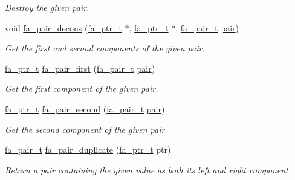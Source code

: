 \begin{DoxyCompactItemize}
\begin{DoxyCompactList}\small\item\em Destroy the given pair. \end{DoxyCompactList}\item 
void \hyperlink{group___fa_pair_ga7e797364d4d31cd174d974b16627cdfe}{fa\-\_\-pair\-\_\-decons} (\hyperlink{group___fa_ga915ddeae99ad7568b273d2b876425197}{fa\-\_\-ptr\-\_\-t} $\ast$, \hyperlink{group___fa_ga915ddeae99ad7568b273d2b876425197}{fa\-\_\-ptr\-\_\-t} $\ast$, \hyperlink{group___fa_pair_gac2b2e58c230bac4f8a63ef6c05072680}{fa\-\_\-pair\-\_\-t} \hyperlink{util_8h_a40ed40659d2ed7f8712b0fe6ba6edebe}{pair})
\begin{DoxyCompactList}\small\item\em Get the first and second components of the given pair. \end{DoxyCompactList}\item 
\hyperlink{group___fa_ga915ddeae99ad7568b273d2b876425197}{fa\-\_\-ptr\-\_\-t} \hyperlink{group___fa_pair_gaa61373d5c0648b4670ff51c483c2977d}{fa\-\_\-pair\-\_\-first} (\hyperlink{group___fa_pair_gac2b2e58c230bac4f8a63ef6c05072680}{fa\-\_\-pair\-\_\-t} \hyperlink{util_8h_a40ed40659d2ed7f8712b0fe6ba6edebe}{pair})
\begin{DoxyCompactList}\small\item\em Get the first component of the given pair. \end{DoxyCompactList}\item 
\hyperlink{group___fa_ga915ddeae99ad7568b273d2b876425197}{fa\-\_\-ptr\-\_\-t} \hyperlink{group___fa_pair_ga4c681f429b7677e05f6f5aadc0d1c18d}{fa\-\_\-pair\-\_\-second} (\hyperlink{group___fa_pair_gac2b2e58c230bac4f8a63ef6c05072680}{fa\-\_\-pair\-\_\-t} \hyperlink{util_8h_a40ed40659d2ed7f8712b0fe6ba6edebe}{pair})
\begin{DoxyCompactList}\small\item\em Get the second component of the given pair. \end{DoxyCompactList}\item 
\hyperlink{group___fa_pair_gac2b2e58c230bac4f8a63ef6c05072680}{fa\-\_\-pair\-\_\-t} \hyperlink{group___fa_pair_gaf0c419c071f484dbd09e9c33b03d1a8c}{fa\-\_\-pair\-\_\-duplicate} (\hyperlink{group___fa_ga915ddeae99ad7568b273d2b876425197}{fa\-\_\-ptr\-\_\-t} ptr)
\begin{DoxyCompactList}\small\item\em Return a pair containing the given value as both its left and right component. \end{DoxyCompactList}\item 

\end{DoxyCompactItemize}
